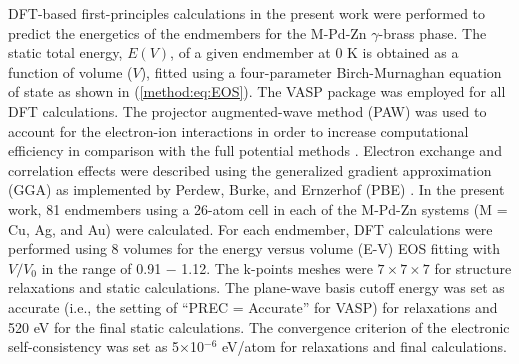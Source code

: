 DFT-based first-principles calculations in the present work were performed to predict the energetics of the endmembers for the M-Pd-Zn $\gamma$-brass phase. The static total energy, $E\left(V\right)$, of a given endmember at 0 K is obtained as a function of volume ($V$), fitted using a four-parameter Birch-Murnaghan equation of state as shown in (\ref{method:eq:EOS}). The VASP package \cite{kresse1996efficient} was employed for all DFT calculations. The projector augmented-wave method (PAW) was used to account for the electron-ion interactions in order to increase computational efficiency in comparison with the full potential methods \cite{blochl1994projector}. Electron exchange and correlation effects were described using the generalized gradient approximation (GGA) as implemented by Perdew, Burke, and Ernzerhof (PBE) \cite{perdew1996generalized}. In the present work, 81 endmembers using a 26-atom cell in each of the M-Pd-Zn systems (M = Cu, Ag, and Au) were calculated. For each endmember, DFT calculations were performed using 8 volumes for the energy versus volume (E-V) EOS fitting with $V/V_0$ in the range of 0.91 $-$ 1.12. The k-points meshes were $7\times7\times7$ for structure relaxations and static calculations. The plane-wave basis cutoff energy was set as accurate (i.e., the setting of “PREC = Accurate” for VASP) for relaxations and 520 eV for the final static calculations. The convergence criterion of the electronic self-consistency was set as 5×10$^{-6}$ eV/atom for relaxations and final calculations.

